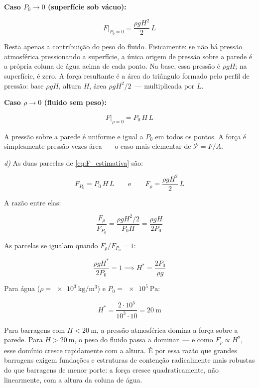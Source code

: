 \begin{exemplo}
\textbf{Caso $P_0 \to 0$ (superfície sob vácuo):}
 
\begin{equation*}
    F\big|_{P_0 = 0} = \frac{\rho g H^2}{2}\,L
\end{equation*}
 
Resta apenas a contribuição do peso do fluido. Fisicamente: se não
há pressão atmosférica pressionando a superfície, a única origem de
pressão sobre a parede é a própria coluna de água acima de cada ponto.
Na base, essa pressão é $\rho g H$; na superfície, é zero. A força
resultante é a área do triângulo formado pelo perfil de pressão:
base $\rho g H$, altura $H$, área $\rho g H^2 / 2$~--- multiplicada
por $L$.
 
\textbf{Caso $\rho \to 0$ (fluido sem peso):}
 
\begin{equation*}
    F\big|_{\rho = 0} = P_0\,H\,L
\end{equation*}
 
A pressão sobre a parede é uniforme e igual a $P_0$ em todos os
pontos. A força é simplesmente pressão vezes área~--- o caso mais
elementar de $\mathcal{P} = F/A$. 

\medskip
 
\textit{d)} As duas parcelas de \eqref{eq:F_estimativa} são:
 
\begin{equation*}
    F_{P_0} = P_0\,H\,L
    \qquad \text{e} \qquad
    F_{\rho} = \frac{\rho g H^2}{2}\,L
\end{equation*}
 
A razão entre elas:
 
\begin{equation}
    \frac{F_{\rho}}{F_{P_0}}
    = \frac{\rho g H^2 / 2}{P_0 H}
    = \frac{\rho g H}{2 P_0}
    \label{eq:razao_parcelas}
\end{equation}
 
As parcelas se igualam quando $F_{\rho}/F_{P_0} = 1$:
 
\begin{equation}
    \frac{\rho g H^*}{2 P_0} = 1
    \implies
    \boxed{H^* = \frac{2 P_0}{\rho g}}
    \label{eq:H_estrela}
\end{equation}
 
Para água ($\rho = \SI{e3}{\kilo\gram\per\metre\cubed}$) e
$P_0 = \SI{e5}{\pascal}$:
 
\begin{equation*}
    H^* = \frac{2 \cdot 10^5}{10^3 \cdot 10} = \SI{20}{\metre}
\end{equation*}
 
Para barragens com $H < \SI{20}{\metre}$, a pressão atmosférica domina
a força sobre a parede. Para $H > \SI{20}{\metre}$, o peso do fluido
passa a dominar~--- e como $F_\rho \propto H^2$, esse domínio cresce
rapidamente com a altura. É por essa razão que grandes barragens
exigem fundações e estruturas de contenção radicalmente mais robustas
do que barragens de menor porte: a força cresce quadraticamente, não
linearmente, com a altura da coluna de água.

\end{exemplo}

